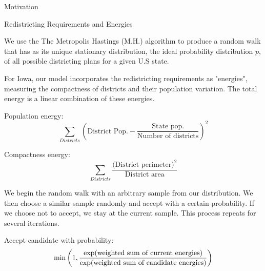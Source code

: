 \documentclass[leqno, handout]{beamer}
\theoremstyle{definition}
\begin{document}
\begin{frame}
\begin{columns}[t]
\begin{column}[t]{.25\linewidth}
\begin{block}{Motivation}
\end{block}

\begin{block}{Redistricting Requirements and Energies}
 
We use the The Metropolis Hastings (M.H.) algorithm to produce a random walk that has as its unique stationary distribution, the ideal probability distribution $p$, of all possible districting plans for a given U.S state.

\medskip

For Iowa, our model incorporates the redistricting requirements as "energies", measuring the compactness of districts and their population variation. The total energy is a linear combination of these energies.

\medskip

Population energy:
\[\sum_{Districts}\left(\text{District Pop.}- \frac{\text{State pop.}}{\text{Number of districts}}\right)^2\]

\medskip

Compactness energy:
\[\sum_{Districts}\frac{\text{(District perimeter)}^2}{\text{District area}}\]

We begin the random walk with an arbitrary sample from our distribution. We then choose a similar sample randomly and accept with a certain probability. If we choose not to accept, we stay at the current sample. This  process repeats for several iterations. 

\medskip

Accept candidate with probability:
\[\text{min}\left(1,\frac{\textnormal{exp(weighted sum of current energies})}{\textnormal{exp(weighted sum of candidate energies})}\right)\]

\end{block}




\end{column}




\end{columns}
\end{frame}
\end{document}
